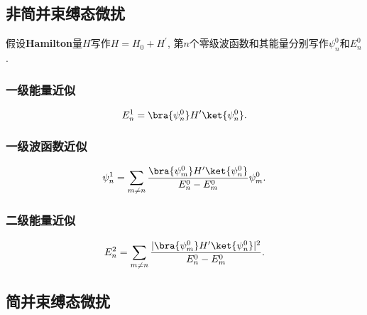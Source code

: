 
\begin{issues}
\end{issues}

\subsection{非简并束缚态微扰}
假设\textbf{Hamilton}量$H$写作$H=H_0+H^{\prime}$, 第$n$个零级波函数和其能量分别写作$\psi^{0}_n$和$E^{0}_n$.
\subsubsection{一级能量近似}
\begin{equation}
E^{1}_n=\bra{\psi^{0}_n}H^{\prime}\ket{\psi^{0}_n}.
\end{equation}
\subsubsection{一级波函数近似}
\begin{equation}
\psi^{1}_n=\sum_{m\ne n}^{} \frac{\bra{\psi^{0}_m}H^{\prime}\ket{\psi^{0}_n}}{E^{0}_n-E^{0}_m}\psi^{0}_m.
\end{equation}
\subsubsection{二级能量近似}
\begin{equation}
E^{2}_n=\sum_{m\ne n}^{} \frac{|\bra{\psi^{0}_m}H^{\prime}\ket{\psi^{0}_n}|^2}{E^{0}_n-E^{0}_m}.
\end{equation}
\subsection{简并束缚态微扰}
